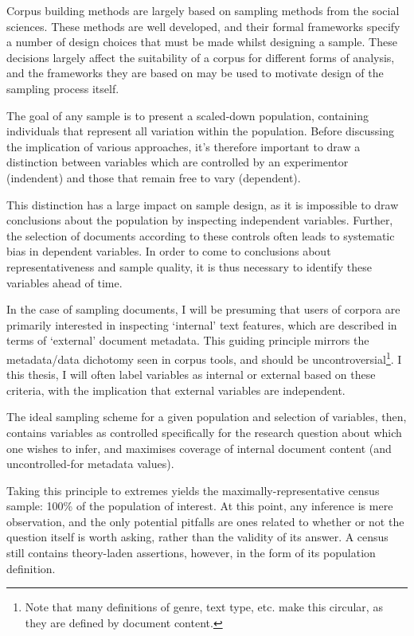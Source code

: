 

Corpus building methods are largely based on sampling methods from the social sciences.  These methods are well developed, and their formal frameworks specify a number of design choices that must be made whilst designing a sample.  These decisions largely affect the suitability of a corpus for different forms of analysis, and the frameworks they are based on may be used to motivate design of the sampling process itself.

The goal of any sample is to present a scaled-down population, containing individuals that represent all variation within the population.  Before discussing the implication of various approaches, it's therefore important to draw a distinction between variables which are controlled by an experimentor (indendent) and those that remain free to vary (dependent).

This distinction has a large impact on sample design, as it is impossible to draw conclusions about the population by inspecting independent variables.  Further, the selection of documents according to these controls often leads to systematic bias in dependent variables.  In order to come to conclusions about representativeness and sample quality, it is thus necessary to identify these variables ahead of time.

In the case of sampling documents, I will be presuming that users of corpora are primarily interested in inspecting `internal' text features, which are described in terms of `external' document metadata.  This guiding principle mirrors the metadata/data dichotomy seen in corpus tools, and should be uncontroversial\footnote{Note that many definitions of genre, text type, etc. make this circular, as they are defined by document content.}.  I this thesis, I will often label variables as internal or external based on these criteria, with the implication that external variables are independent.

The ideal sampling scheme for a given population and selection of variables, then, contains variables as controlled specifically for the research question about which one wishes to infer, and maximises coverage of internal document content (and uncontrolled-for metadata values).

Taking this principle to extremes yields the maximally-representative census sample: 100\% of the population of interest.  At this point, any inference is mere observation, and the only potential pitfalls are ones related to whether or not the question itself is worth asking, rather than the validity of its answer.  A census still contains theory-laden assertions, however, in the form of its population definition.


